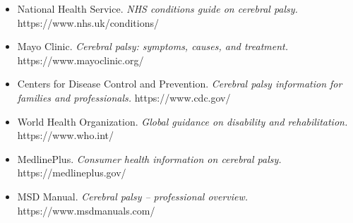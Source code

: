 \begin{itemize}
    \item National Health Service. \textit{NHS conditions guide on cerebral palsy.} https://www.nhs.uk/conditions/
    \item Mayo Clinic. \textit{Cerebral palsy: symptoms, causes, and treatment.} https://www.mayoclinic.org/
    \item Centers for Disease Control and Prevention. \textit{Cerebral palsy information for families and professionals.} https://www.cdc.gov/
    \item World Health Organization. \textit{Global guidance on disability and rehabilitation.} https://www.who.int/
    \item MedlinePlus. \textit{Consumer health information on cerebral palsy.} https://medlineplus.gov/
    \item MSD Manual. \textit{Cerebral palsy -- professional overview.} https://www.msdmanuals.com/
\end{itemize}
